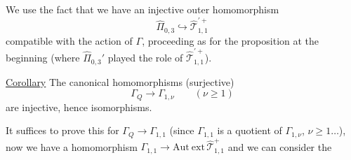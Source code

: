 We use the fact that we have an injective outer homomorphism
\[
\widehat{\Pi}_{0,3}\hookrightarrow\widehat{\mathcal T}_{1,1}^{\prime+}
\]
compatible with the action of $\Gamma$, proceeding as for the proposition at the beginning (where $\widehat{\Pi}_{0,3}'$ played the role of $\widehat{\mathcal T}_{1,1}^{\prime+}$).

\uline{Corollary} The canonical homomorphisms (surjective)
\[
\tag{43}
\Gamma_Q\longrightarrow\Gamma_{1,\nu}\qquad(\nu\geq1)
\]
are injective, hence isomorphisms.

It suffices to prove this for $\Gamma_Q\longrightarrow\Gamma_{1,1}$ (since $\Gamma_{1,1}$ is a quotient of $\Gamma_{1,\nu}$, $\nu\geq1\ldots$), now we have a homomorphism  $\Gamma_{1,1}\longrightarrow\mathrm{Aut\ ext}\,\widehat{\mathcal T}_{1,1}^{+}$ and we can consider the 
